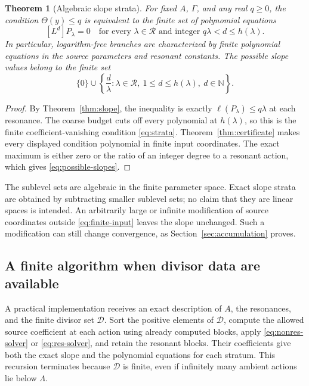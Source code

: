 \documentclass[11pt,a4paper]{article}
\numberwithin{equation}{section}
\newtheorem{theorem}{Theorem}[section]
\theoremstyle{definition}
\theoremstyle{remark}
\newcommand{\NN}{\mathbb N}
\newcommand{\G}{\Gamma}
\newcommand{\Reson}{\mathcal R}
\begin{document}
\begin{theorem}[Algebraic slope strata]\label{thm:strata}
For fixed \(A\), \(\G\), and any real \(q\ge0\), the condition
\(\Theta(y)\le q\) is equivalent to the finite set of polynomial
equations
\begin{equation}\label{eq:strata}
 [L^d]P_\lambda=0
 \quad\text{for every }\lambda\in\Reson
 \text{ and integer }q\lambda<d\le h(\lambda).
\end{equation}
In particular, logarithm-free branches are characterized by finite
polynomial equations in the source parameters and resonant constants.
The possible slope values belong to the finite set
\begin{equation}\label{eq:possible-slopes}
 \{0\}\cup
 \left\{\frac d\lambda:
          \lambda\in\Reson,\ 1\le d\le h(\lambda),\ d\in\NN\right\}.
\end{equation}
\end{theorem}
\begin{proof}
By Theorem~\ref{thm:slope}, the inequality is exactly
\(\ell(P_\lambda)\le q\lambda\) at each resonance. The coarse
budget cuts off every polynomial at \(h(\lambda)\), so this is the
finite coefficient-vanishing condition \eqref{eq:strata}.
Theorem~\ref{thm:certificate} makes every displayed condition
polynomial in finite input coordinates. The exact maximum is either
zero or the ratio of an integer degree to a resonant action, which
gives \eqref{eq:possible-slopes}.
\end{proof}

The sublevel sets are algebraic in the finite parameter space. Exact
slope strata are obtained by subtracting smaller sublevel sets; no
claim that they are linear spaces is intended. An arbitrarily large
or infinite modification of source coordinates outside
\eqref{eq:finite-input} leaves the slope unchanged. Such a modification
can still change convergence, as Section~\ref{sec:accumulation} proves.

\subsection{A finite algorithm when divisor data are available}
A practical implementation receives an exact description of \(A\),
the resonances, and the finite divisor set \(\mathcal D\). Sort the
positive elements of \(\mathcal D\), compute the allowed source
coefficient at each action using already computed blocks, apply
\eqref{eq:nonres-solver} or \eqref{eq:res-solver}, and retain the
resonant blocks. Their coefficients give both the exact slope and the
polynomial equations for each stratum. This recursion terminates
because \(\mathcal D\) is finite, even if infinitely many ambient
actions lie below \(\Lambda\).
\end{document}

